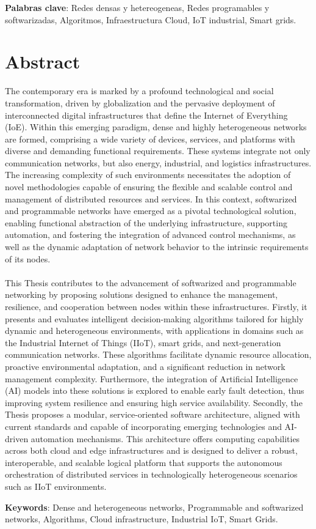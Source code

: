 \vspace{0.5cm}

\textbf{Palabras clave}: Redes densas y hetereogeneas, Redes programables y softwarizadas, Algoritmos, Infraestructura Cloud, IoT industrial, Smart grids.


\clearemptydoublepage %


\chapter{Abstract}

The contemporary era is marked by a profound technological and social transformation, driven by globalization and the pervasive deployment of interconnected digital infrastructures that define the Internet of Everything (IoE). Within this emerging paradigm, dense and highly heterogeneous networks are formed, comprising a wide variety of devices, services, and platforms with diverse and demanding functional requirements. These systems integrate not only communication networks, but also energy, industrial, and logistics infrastructures. The increasing complexity of such environments necessitates the adoption of novel methodologies capable of ensuring the flexible and scalable control and management of distributed resources and services. In this context, softwarized and programmable networks have emerged as a pivotal technological solution, enabling functional abstraction of the underlying infrastructure, supporting automation, and fostering the integration of advanced control mechanisms, as well as the dynamic adaptation of network behavior to the intrinsic requirements of its nodes.\\
\\
This Thesis contributes to the advancement of softwarized and programmable networking by proposing solutions designed to enhance the management, resilience, and cooperation between nodes within these infrastructures. Firstly, it presents and evaluates intelligent decision-making algorithms tailored for highly dynamic and heterogeneous environments, with applications in domains such as the Industrial Internet of Things (IIoT), smart grids, and next-generation communication networks. These algorithms facilitate dynamic resource allocation, proactive environmental adaptation, and a significant reduction in network management complexity. Furthermore, the integration of Artificial Intelligence (AI) models into these solutions is explored to enable early fault detection, thus improving system resilience and ensuring high service availability. Secondly, the Thesis proposes a modular, service-oriented software architecture, aligned with current standards and capable of incorporating emerging technologies and AI-driven automation mechanisms. This architecture offers computing capabilities across both cloud and edge infrastructures and is designed to deliver a robust, interoperable, and scalable logical platform that supports the autonomous orchestration of distributed services in technologically heterogeneous scenarios such as IIoT environments.

\vspace{0.5cm}

\textbf{Keywords}: Dense and heterogeneous networks, Programmable and softwarized networks, Algorithms, Cloud infrastructure, Industrial IoT, Smart Grids.

\clearemptydoublepage %